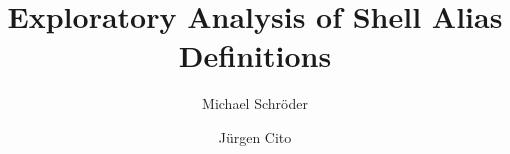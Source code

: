 \documentclass[sigconf,review]{acmart}
\begin{document}
\title{Exploratory Analysis of Shell Alias Definitions}

\author{Michael Schröder}

\author{Jürgen Cito}

\begin{abstract}

\end{abstract}

\maketitle







%










%
\end{document}
